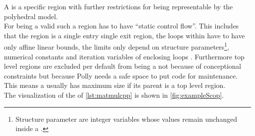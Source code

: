 A \scop is a specific region with further restrictions for being representable by the polyhedral model.\\
For being a valid \scop such a region has to have \enquote{static control flow}.
This includes that the region is a single entry single exit region, the loops within have to have only affine linear bounds, \eg the limits only depend on structure parameters\footnote{Structure parameter are integer variables whose values remain unchanged inside a \scop.}, numerical constants and iteration variables of enclosing loops \cite{GanserIterativeSchedule}. %
Furthermore top level regions are excluded per default from being a \scop not because of conceptional constraints but because Polly needs a safe space to put code for maintenance.
This means a \scop usually has maximum size if its parent is a top level region.\\
The visualization of the \scops of \autoref{lst:matmulcpp} is shown in \autoref{fig:exampleScop}.
